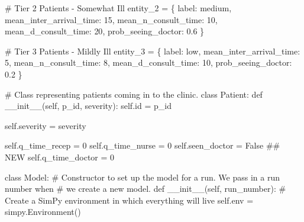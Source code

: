 \documentclass[
  letterpaper,
  DIV=11,
  numbers=noendperiod]{scrreprt}
\newenvironment{Shaded}{}{}
\newcommand{\BuiltInTok}[1]{\textcolor[rgb]{0.84,0.23,0.29}{#1}}
\newcommand{\CommentTok}[1]{\textcolor[rgb]{0.42,0.45,0.49}{#1}}
\newcommand{\DecValTok}[1]{\textcolor[rgb]{0.00,0.36,0.77}{#1}}
\newcommand{\FloatTok}[1]{\textcolor[rgb]{0.00,0.36,0.77}{#1}}
\newcommand{\FunctionTok}[1]{\textcolor[rgb]{0.44,0.26,0.76}{#1}}
\newcommand{\KeywordTok}[1]{\textcolor[rgb]{0.84,0.23,0.29}{#1}}
\newcommand{\NormalTok}[1]{\textcolor[rgb]{0.14,0.16,0.18}{#1}}
\newcommand{\OperatorTok}[1]{\textcolor[rgb]{0.14,0.16,0.18}{#1}}
\newcommand{\StringTok}[1]{\textcolor[rgb]{0.01,0.18,0.38}{#1}}
\newcommand{\VariableTok}[1]{\textcolor[rgb]{0.89,0.38,0.04}{#1}}
\begin{document}
\begin{tcolorbox}
\begin{Shaded}
\begin{Highlighting}[]
    \CommentTok{\# Tier 2 Patients {-} Somewhat Ill}
\NormalTok{    entity\_2 }\OperatorTok{=}\NormalTok{ \{}
        \StringTok{\textquotesingle{}label\textquotesingle{}}\NormalTok{: }\StringTok{\textquotesingle{}medium\textquotesingle{}}\NormalTok{,}
        \StringTok{\textquotesingle{}mean\_inter\_arrival\_time\textquotesingle{}}\NormalTok{: }\DecValTok{15}\NormalTok{,}
        \StringTok{\textquotesingle{}mean\_n\_consult\_time\textquotesingle{}}\NormalTok{: }\DecValTok{10}\NormalTok{,}
        \StringTok{\textquotesingle{}mean\_d\_consult\_time\textquotesingle{}}\NormalTok{: }\DecValTok{20}\NormalTok{,}
        \StringTok{\textquotesingle{}prob\_seeing\_doctor\textquotesingle{}}\NormalTok{: }\FloatTok{0.6}
\NormalTok{    \}}

    \CommentTok{\# Tier 3 Patients {-} Mildly Ill}
\NormalTok{    entity\_3 }\OperatorTok{=}\NormalTok{ \{}
        \StringTok{\textquotesingle{}label\textquotesingle{}}\NormalTok{: }\StringTok{\textquotesingle{}low\textquotesingle{}}\NormalTok{,}
        \StringTok{\textquotesingle{}mean\_inter\_arrival\_time\textquotesingle{}}\NormalTok{: }\DecValTok{5}\NormalTok{,}
        \StringTok{\textquotesingle{}mean\_n\_consult\_time\textquotesingle{}}\NormalTok{: }\DecValTok{8}\NormalTok{,}
        \StringTok{\textquotesingle{}mean\_d\_consult\_time\textquotesingle{}}\NormalTok{: }\DecValTok{10}\NormalTok{,}
        \StringTok{\textquotesingle{}prob\_seeing\_doctor\textquotesingle{}}\NormalTok{: }\FloatTok{0.2}
\NormalTok{    \}}

\CommentTok{\# Class representing patients coming in to the clinic.}
\KeywordTok{class}\NormalTok{ Patient:}
    \KeywordTok{def} \FunctionTok{\_\_init\_\_}\NormalTok{(}\VariableTok{self}\NormalTok{, p\_id, severity):}
        \VariableTok{self}\NormalTok{.}\BuiltInTok{id} \OperatorTok{=}\NormalTok{ p\_id}

        \VariableTok{self}\NormalTok{.severity }\OperatorTok{=}\NormalTok{ severity}

        \VariableTok{self}\NormalTok{.q\_time\_recep }\OperatorTok{=} \DecValTok{0}
        \VariableTok{self}\NormalTok{.q\_time\_nurse }\OperatorTok{=} \DecValTok{0}
        \VariableTok{self}\NormalTok{.seen\_doctor }\OperatorTok{=} \VariableTok{False} \CommentTok{\#\# NEW}
        \VariableTok{self}\NormalTok{.q\_time\_doctor }\OperatorTok{=} \DecValTok{0}

\KeywordTok{class}\NormalTok{ Model:}
    \CommentTok{\# Constructor to set up the model for a run.  We pass in a run number when}
    \CommentTok{\# we create a new model.}
    \KeywordTok{def} \FunctionTok{\_\_init\_\_}\NormalTok{(}\VariableTok{self}\NormalTok{, run\_number):}
        \CommentTok{\# Create a SimPy environment in which everything will live}
        \VariableTok{self}\NormalTok{.env }\OperatorTok{=}\NormalTok{ simpy.Environment()}


\end{Highlighting}
\end{Shaded}
\end{tcolorbox}
\end{document}
